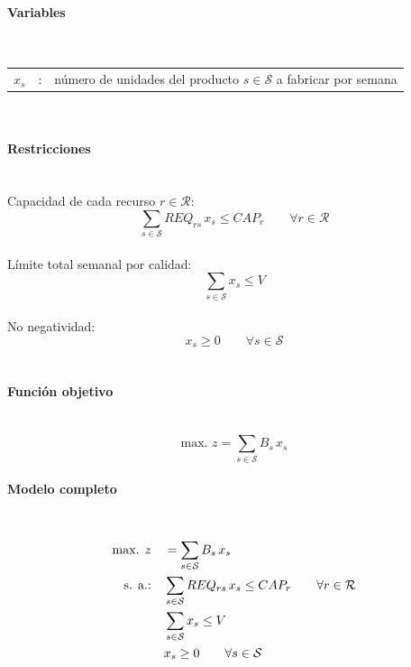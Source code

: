 \paragraph{Variables}\mbox{}\\
\begin{tabular}{l c l}
    $x_s$  & : & número de unidades del producto $s \in \mathcal{S}$ a fabricar por semana\\
\end{tabular}
\\

\paragraph{Restricciones}\mbox{}\\
Capacidad de cada recurso $r \in \mathcal{R}$:
\begin{equation}
    \sum_{s \in \mathcal{S}} REQ_{rs}\, x_s \leq CAP_r \qquad \forall r \in \mathcal{R}
\end{equation}
\\
Límite total semanal por calidad:
\begin{equation}
    \sum_{s \in \mathcal{S}} x_s \leq V
\end{equation}
\\
No negatividad:
\begin{equation}
    x_s \geq 0 \qquad \forall s \in \mathcal{S}
\end{equation}
\\

\paragraph{Función objetivo}\mbox{}\\
\begin{equation}
\mbox{max. } z = \sum_{s \in \mathcal{S}} B_s\, x_s
\end{equation}

\paragraph{Modelo completo}\mbox{}\\
\begin{align}
\mbox{max. } z \quad & = \sum_{s \in \mathcal{S}} B_s\, x_s \notag \\
\mbox{s. a.:} \quad 
& \sum_{s \in \mathcal{S}} REQ_{rs}\, x_s \leq CAP_r \qquad \forall r \in \mathcal{R} \notag \\
& \sum_{s \in \mathcal{S}} x_s \leq V \notag \\
& x_s \geq 0 \qquad \forall s \in \mathcal{S} \notag
\end{align}

